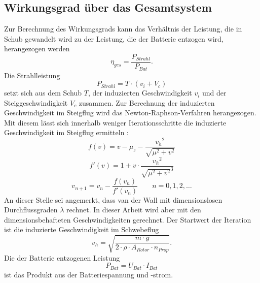 \subsection{Wirkungsgrad über das Gesamtsystem}
Zur Berechnung des Wirkungsgrads kann das Verhältnis der Leistung, die in Schub gewandelt wird zu der Leistung, die der Batterie entzogen wird, herangezogen werden
\begin{equation}
	\eta_{ges} = \frac{P_{Strahl}}{P_{Bat}}.
\end{equation}
Die Strahlleistung 
\begin{equation}
	P_{Strahl} = T\cdot (v_i + V_c)
\end{equation}
setzt sich aus dem Schub \ensuremath{T}, der induzierten Geschwindigkeit \ensuremath{v_i} und der Steiggeschwindigkeit \ensuremath{V_c} zusammen.
Zur Berechnung der induzierten Geschwindigkeit im Steigflug wird das Newton-Raphson-Verfahren herangezogen. Mit diesem lässt sich innerhalb weniger Iterationsschritte die induzierte Geschwindigkeit im Steigflug ermitteln \cite{Wall.2015}:
\begin{equation}
	f(v) = v-\mu_z-\frac{{v_h}^2}{\sqrt{\mu^2+v^2}}
\end{equation}
\begin{equation}
	f'(v) = 1 + v\cdot\frac{{v_h}^2}{\sqrt{\mu^2+v^2}^3}
\end{equation}
\begin{equation}
	v_{n+1} = v_n - \frac{f(v_n)}{f'(v_n)}\qquad n = 0,1,2,\dots
\end{equation}
An dieser Stelle sei angemerkt, dass van der Wall mit dimensionslosen Durchflussgraden \ensuremath{\lambda} rechnet. In dieser Arbeit wird aber mit den dimensionsbehafteten Geschwindigkeiten gerechnet.
Der Startwert der Iteration ist die induzierte Geschwindigkeit im Schwebeflug
\begin{equation}
	v_h = \sqrt{\frac{m\cdot g}{2\cdot\rho\cdot A_{Rotor}\cdot n_{Prop}}}.
\end{equation}
Die der Batterie entzogenen Leistung
\begin{equation}
	P_{Bat} = U_{Bat}\cdot I_{Bat}
\end{equation}
ist das Produkt aus der Batteriespannung und -strom.


